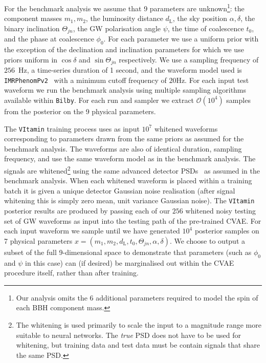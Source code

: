 \documentclass{article}
\begin{document}
%
%
For the benchmark analysis we assume that 9 parameters are
unknown\footnote{Our analysis omits the 6 additional parameters required to
model the spin of each \ac{BBH} component mass.}: the component masses
$m_1,m_2$, the luminosity distance $d_{\text{L}}$, the sky position
$\alpha,\delta$, the binary inclination $\Theta_{jn}$, the \ac{GW} polarisation
angle ${\psi}$, the time of coalescence $t_{0}$, and the phase at coalescence
$\phi_0$. For each parameter we use a uniform prior with the exception of
the declination and inclination parameters for which we use priors uniform in
$\cos\delta$ and $\sin\Theta_{jn}$ respectively. 
We use a sampling frequency of $256$~Hz, a time-series duration of 1 second, and
the waveform model used is \texttt{IMRPhenomPv2}~\cite{1809.10113} with a
minimum cutoff frequency of $20$Hz. For each input test waveform we run the
benchmark analysis using multiple sampling algorithms available within
\texttt{Bilby}. For each run and sampler we extract $\mathcal{O}(10^4)$
samples from the posterior on the 9 physical parameters.  

%
%
The \texttt{VItamin} training process uses as input $10^{7}$ whitened
waveforms corresponding to parameters drawn from the same priors as assumed for
the benchmark analysis. The waveforms are also of identical duration, sampling
frequency, and use the same waveform model as in the benchmark analysis.
The signals are whitened\footnote{The whitening is used primarily to
scale the input to a magnitude range more suitable to neural networks. The
\emph{true} \ac{PSD} does not have to be used for whitening, but training data
and test data must be contain signals that share the same \ac{PSD}.}
using the same advanced detector \acp{PSD}~\cite{aligo_noisecurves} as
assumed in the benchmark analysis. When each whitened waveform is placed
within a training batch it is given a unique detector Gaussian noise
realisation (after signal whitening this is simply zero mean, unit
variance Gaussian noise). The \texttt{VItamin} posterior results are produced by
passing each of our $256$ whitened noisy testing set of \ac{GW} waveforms
as input into the testing path of the pre-trained
\ac{CVAE}. For each input waveform we sample until we
have generated $10^4$ posterior samples on 7 physical parameters
$x=(m_1,m_2,d_{\text{L}},t_{0},\Theta_{jn},\alpha,\delta)$. We choose to
output a subset of the full 9-dimensional space to demonstrate that parameters
(such as $\phi_0$ and $\psi$ in this case) can (if desired) be
marginalised out within the \ac{CVAE} procedure itself, rather than after
training. 
\end{document}
